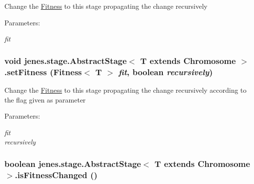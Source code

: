 Change the \hyperlink{}{Fitness} to this stage propagating the change recursively \begin{Desc}
\item[Parameters:]
\begin{description}
\item[{\em fit}]\end{description}
\end{Desc}
\hypertarget{classjenes_1_1stage_1_1_abstract_stage_3_01_t_01extends_01_chromosome_01_4_ff1c8307dc89c4fcf7f253b50a87464d}{
\subsubsection[setFitness]{\setlength{\rightskip}{0pt plus 5cm}void jenes.stage.AbstractStage$<$ T extends Chromosome $>$.setFitness (Fitness$<$ T $>$ {\em fit}, \/  boolean {\em recursively})}}
\label{classjenes_1_1stage_1_1_abstract_stage_3_01_t_01extends_01_chromosome_01_4_ff1c8307dc89c4fcf7f253b50a87464d}


Change the \hyperlink{}{Fitness} to this stage propagating the change recursively according to the flag given as parameter \begin{Desc}
\item[Parameters:]
\begin{description}
\item[{\em fit}]\item[{\em recursively}]\end{description}
\end{Desc}
\hypertarget{classjenes_1_1stage_1_1_abstract_stage_3_01_t_01extends_01_chromosome_01_4_811a041cd505ad8400b3c8b2aa36f4a9}{
\subsubsection[isFitnessChanged]{\setlength{\rightskip}{0pt plus 5cm}boolean jenes.stage.AbstractStage$<$ T extends Chromosome $>$.isFitnessChanged ()}}
\label{classjenes_1_1stage_1_1_abstract_stage_3_01_t_01extends_01_chromosome_01_4_811a041cd505ad8400b3c8b2aa36f4a9}



